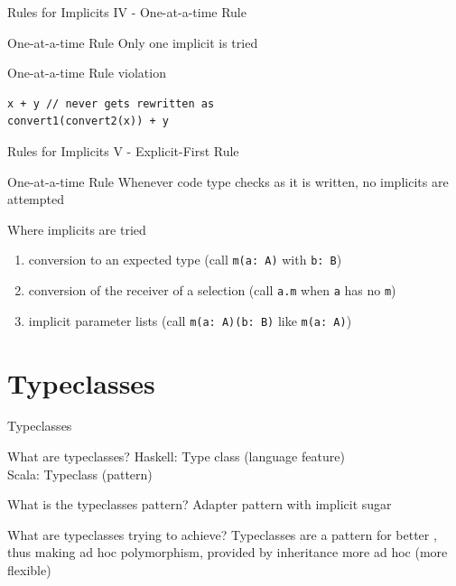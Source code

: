 \begin{frame}[fragile]{Rules for Implicits IV - One-at-a-time Rule}
\begin{block}{One-at-a-time Rule}
Only one implicit is tried
\end{block}
\begin{alertblock}{One-at-a-time Rule violation}
\begin{lstlisting}
x + y // never gets rewritten as
convert1(convert2(x)) + y
\end{lstlisting}
\end{alertblock}
\end{frame}

\begin{frame}[fragile]{Rules for Implicits V - Explicit-First Rule}
\begin{block}{One-at-a-time Rule}
Whenever code type checks as it is written, no implicits are attempted
\end{block}
\pause
\begin{block}{Where implicits are tried}
\begin{enumerate}
  \item conversion to an expected type (call \lstinline!m(a: A)! with \lstinline!b: B!)
  \item conversion of the receiver of a selection (call \lstinline!a.m! when \lstinline!a! has no \lstinline!m!)
  \item implicit parameter lists (call \lstinline!m(a: A)(b: B)! like \lstinline!m(a: A)!)
\end{enumerate}
\end{block}
\end{frame}

\section{Typeclasses}
\begin{frame}[fragile]{Typeclasses}
\begin{block}{What are typeclasses?}
Haskell: Type class (language feature)\\
Scala: Typeclass (pattern)
\end{block}
\pause
\begin{block}{What is the typeclasses pattern?}
Adapter pattern with implicit sugar
\end{block}
\pause
\begin{block}{What are typeclasses trying to achieve?}
Typeclasses are a pattern for better , thus making ad hoc
polymorphism, provided by inheritance more ad hoc (more flexible)
\end{block}
\end{frame}

